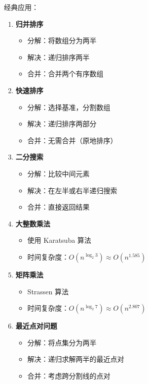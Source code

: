 经典应用：
\begin{enumerate}
  \item \textbf{归并排序}
    \begin{itemize}
      \item 分解：将数组分为两半
      \item 解决：递归排序两半
      \item 合并：合并两个有序数组
    \end{itemize}

  \item \textbf{快速排序}
    \begin{itemize}
      \item 分解：选择基准，分割数组
      \item 解决：递归排序两部分
      \item 合并：无需合并（原地排序）
    \end{itemize}

  \item \textbf{二分搜索}
    \begin{itemize}
      \item 分解：比较中间元素
      \item 解决：在左半或右半递归搜索
      \item 合并：直接返回结果
    \end{itemize}

  \item \textbf{大整数乘法}
    \begin{itemize}
      \item 使用 Karatsuba 算法
      \item 时间复杂度：$O(n^{\log_2 3}) \approx O(n^{1.585})$
    \end{itemize}

  \item \textbf{矩阵乘法}
    \begin{itemize}
      \item Strassen 算法
      \item 时间复杂度：$O(n^{\log_2 7}) \approx O(n^{2.807})$
    \end{itemize}

  \item \textbf{最近点对问题}
    \begin{itemize}
      \item 分解：将点集分为两半
      \item 解决：递归求解两半的最近点对
      \item 合并：考虑跨分割线的点对
    \end{itemize}
\end{enumerate}

